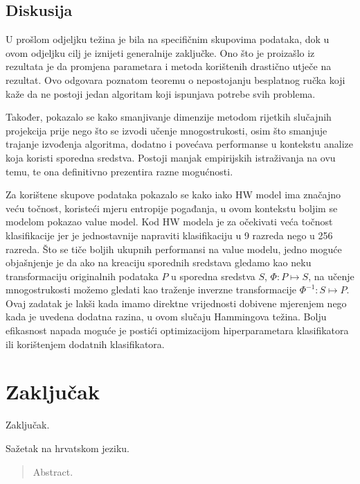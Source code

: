 \documentclass[times, utf8, diplomski]{fer}
\begin{document}
\section{Diskusija}
U prošlom odjeljku težina je bila na specifičnim skupovima podataka, dok u ovom odjeljku cilj je iznijeti generalnije zaključke. Ono što je proizašlo iz rezultata je da promjena parametara i metoda korištenih drastično utječe na rezultat. Ovo odgovara poznatom teoremu o nepostojanju besplatnog ručka  koji kaže da ne postoji jedan algoritam koji ispunjava potrebe svih problema. 

Također, pokazalo se kako smanjivanje dimenzije metodom rijetkih slučajnih projekcija prije nego što se izvodi učenje mnogostrukosti, osim što smanjuje trajanje izvođenja algoritma, dodatno i povećava performanse u kontekstu analize koja koristi sporedna sredstva. Postoji manjak empirijskih istraživanja na ovu temu, te ona definitivno prezentira razne mogućnosti. 

Za korištene skupove podataka pokazalo se kako iako HW model ima značajno veću točnost, koristeći mjeru entropije pogađanja, u ovom kontekstu boljim se modelom pokazao value model. Kod HW modela je za očekivati veća točnost klasifikacije jer je jednostavnije napraviti klasifikaciju u 9 razreda nego u 256 razreda. Što se tiče boljih ukupnih performansi na value modelu, jedno moguće objašnjenje je da ako na kreaciju sporednih sredstava gledamo kao neku transformaciju originalnih podataka $P$ u sporedna sredstva $S$, $\Phi: P \mapsto S$, na učenje mnogostrukosti možemo gledati kao traženje inverzne transformacije $\Phi^{-1}: S \mapsto P$. Ovaj zadatak je lakši kada imamo direktne vrijednosti dobivene mjerenjem nego kada je uvedena dodatna razina, u ovom slučaju Hammingova težina. 
Bolju efikasnost napada moguće je postići optimizacijom hiperparametara klasifikatora ili korištenjem dodatnih klasifikatora.

\chapter{Zaključak}
Zaključak.





\begin{sazetak}
    Sažetak na hrvatskom jeziku.

\end{sazetak}

\begin{abstract}
    Abstract.

\end{abstract}
\end{document}
